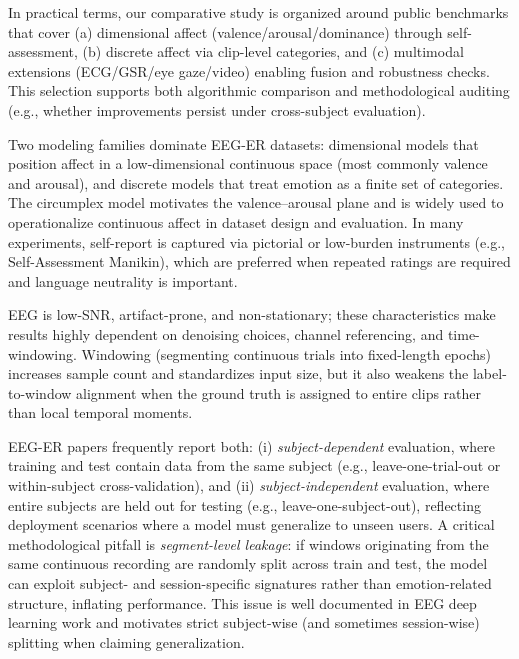 \documentclass{WileyMSP-template}
\begin{document}
In practical terms, our comparative study is organized around public benchmarks that cover (a) dimensional affect (valence/arousal/dominance) through self-assessment, (b) discrete affect via clip-level categories, and (c) multimodal extensions (ECG/GSR/eye gaze/video) enabling fusion and robustness checks. This selection supports both algorithmic comparison and methodological auditing (e.g., whether improvements persist under cross-subject evaluation). \cite{li2022tutorial,kukhilava2025evaluation}

Two modeling families dominate EEG-ER datasets: dimensional models that position affect in a low-dimensional continuous space (most commonly valence and arousal), and discrete models that treat emotion as a finite set of categories. The circumplex model motivates the valence--arousal plane and is widely used to operationalize continuous affect in dataset design and evaluation. \cite{russell1980circumplex}
In many experiments, self-report is captured via pictorial or low-burden instruments (e.g., Self-Assessment Manikin), which are preferred when repeated ratings are required and language neutrality is important. \cite{bradley1994sam}

EEG is low-SNR, artifact-prone, and non-stationary; these characteristics make results highly dependent on denoising choices, channel referencing, and time-windowing. \cite{zheng2015seed}
Windowing (segmenting continuous trials into fixed-length epochs) increases sample count and standardizes input size, but it also weakens the label-to-window alignment when the ground truth is assigned to entire clips rather than local temporal moments. \cite{kukhilava2025evaluation}

EEG-ER papers frequently report both:
(i) \emph{subject-dependent} evaluation, where training and test contain data from the same subject (e.g., leave-one-trial-out or within-subject cross-validation), and
(ii) \emph{subject-independent} evaluation, where entire subjects are held out for testing (e.g., leave-one-subject-out), reflecting deployment scenarios where a model must generalize to unseen users. \cite{kukhilava2025evaluation,li2022tutorial}
A critical methodological pitfall is \emph{segment-level leakage}: if windows originating from the same continuous recording are randomly split across train and test, the model can exploit subject- and session-specific signatures rather than emotion-related structure, inflating performance. This issue is well documented in EEG deep learning work and motivates strict subject-wise (and sometimes session-wise) splitting when claiming generalization. \cite{brookshire2024leakage,kukhilava2025evaluation}
\end{document}
